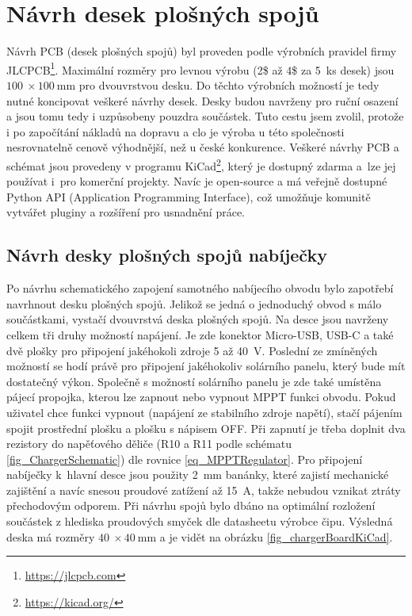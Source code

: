 \chapter{Návrh desek plošných spojů}

Návrh PCB (desek plošných spojů) byl proveden podle výrobních pravidel firmy JLCPCB\footnote{\url{https://jlcpcb.com}}. Maximální rozměry pro levnou výrobu (2\$ až 4\$ za 5~ks desek) jsou $\SI{100}{}\times \SI{100}{\milli\metre}$ pro dvouvrstvou desku. Do těchto výrobních možností je tedy nutné koncipovat veškeré návrhy desek. Desky budou navrženy pro ruční osazení a jsou tomu tedy i uzpůsobeny pouzdra součástek. Tuto cestu jsem zvolil, protože i po započítání nákladů na dopravu a clo je výroba u této společnosti nesrovnatelně cenově výhodnější, než u české konkurence. Veškeré návrhy PCB a schémat jsou provedeny v programu KiCad\footnote{\url{https://kicad.org/}}, který je dostupný zdarma a~lze jej používat i~pro komerční projekty. Navíc je open-source a má veřejně dostupné Python API (Application Programming Interface), což umožňuje komunitě vytvářet pluginy a rozšíření pro usnadnění práce.

\section{Návrh desky plošných spojů nabíječky}

Po návrhu schematického zapojení samotného nabíjecího obvodu bylo zapotřebí navrhnout desku plošných spojů. Jelikož se jedná o jednoduchý obvod s málo součástkami, vystačí dvouvrstvá deska plošných spojů. Na desce jsou navrženy celkem tři druhy možností napájení. Je zde konektor Micro-USB, USB-C a také dvě plošky pro připojení jakéhokoli zdroje \SI{5}{} až \SI{40}{\volt}. Poslední ze zmíněných možností se hodí právě pro připojení jakéhokoliv solárního panelu, který bude mít dostatečný výkon. Společně s možností solárního panelu je zde také umístěna pájecí propojka, kterou lze zapnout nebo vypnout MPPT funkci obvodu. Pokud uživatel chce funkci vypnout (napájení ze stabilního zdroje napětí), stačí pájením spojit prostřední plošku a plošku s nápisem OFF. Při zapnutí je třeba doplnit dva rezistory do napěťového děliče (R10 a R11 podle schématu \ref{fig_ChargerSchematic}) dle rovnice \ref{eq_MPPTRegulator}. Pro připojení nabíječky k~hlavní desce jsou použity \SI{2}{\milli\metre} banánky, které zajistí mechanické zajištění a navíc snesou proudové zatížení až \SI{15}{\ampere}, takže nebudou vznikat ztráty přechodovým odporem. Při návrhu spojů bylo dbáno na optimální rozložení součástek z hlediska proudových smyček dle datasheetu výrobce čipu. Výsledná deska má rozměry $\SI{40}{}\times \SI{40}{\milli\metre}$ a je vidět na obrázku \ref{fig_chargerBoardKiCad}.

